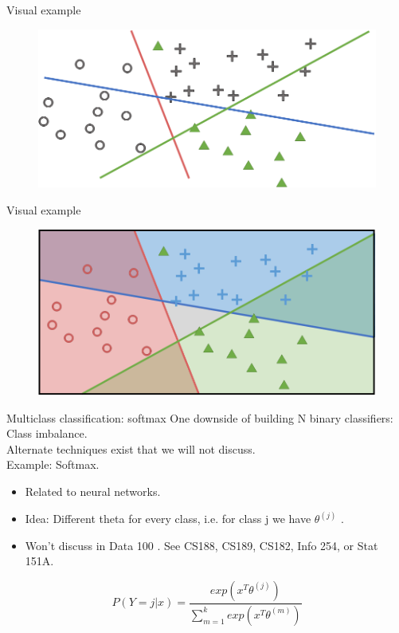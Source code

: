 \documentclass[aspectratio=169]{../latex_main/tntbeamer}  %
\begin{document}
	
	\begin{frame}{Visual example}
	    \begin{figure}
	        \centering
	        \includegraphics[scale=.5]{Bild52}
	    \end{figure}
	\end{frame}
	
	
	\begin{frame}{Visual example}
	    \begin{figure}
	        \centering
	        \includegraphics[scale=.5]{Bild53}
	    \end{figure}
	\end{frame}
	
	
	
	\begin{frame}{Multiclass classification: softmax}
	    One downside of building N binary classifiers: Class imbalance.\\
        Alternate techniques exist that we will not discuss.\\
        \bigskip
        Example: Softmax.
        \begin{itemize}
            \item Related to neural networks.
            \item Idea: Different theta for every class, i.e. for class j we have   $\theta^{(j)}$       . 
            \item Won’t discuss in Data 100 . See CS188, CS189, CS182, Info 254, or Stat 151A.
        \end{itemize}
        
        \begin{equation*}
            P(Y=j|x) = \frac{exp(x^T\theta^{(j)})}{\sum_{m=1}^kexp(x^T\theta^{(m)})}
        \end{equation*}
	\end{frame}
\end{document}
